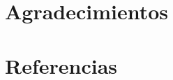     
    \section{Agradecimientos}
    
    
    
    \section{Referencias}
    
    
    
    
    
